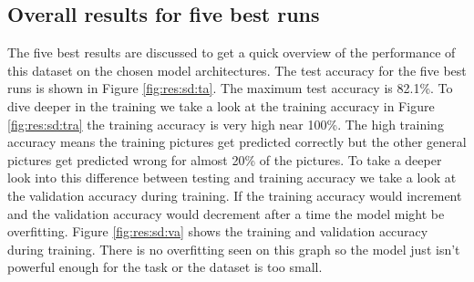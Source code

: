 	\subsection{Overall results for five best runs}
		The five best results are discussed to get a quick overview of the performance of this dataset on the chosen model architectures. The test accuracy for the five best runs is shown in Figure \ref{fig:res:sd:ta}. The maximum test accuracy is 82.1\%. To dive deeper in the training we take a look at the training accuracy in Figure \ref{fig:res:sd:tra} the training accuracy is very high near 100\%. The high training accuracy means the training pictures get predicted correctly but the other general pictures get predicted wrong for almost 20\% of the pictures. To take a deeper look into this difference between testing and training accuracy we take a look at the validation accuracy during training. If the training accuracy would increment and the validation accuracy would decrement after a time the model might be overfitting. Figure \ref{fig:res:sd:va} shows the training and validation accuracy during training. There is no overfitting seen on this graph so the model just isn't powerful enough for the task or the dataset is too small.
